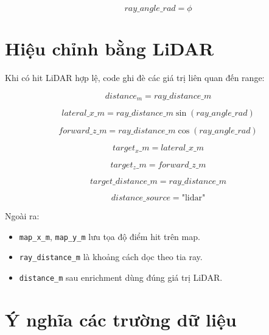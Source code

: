 \documentclass[12pt,a4paper]{article}
\begin{document}
\begin{equation}
ray\_angle\_rad = \phi
\end{equation}

\section{Hiệu chỉnh bằng LiDAR}

Khi có hit LiDAR hợp lệ, code ghi đè các giá trị liên quan đến range:

\begin{equation}
distance_m = ray\_distance\_m
\end{equation}

\begin{equation}
lateral\_x\_m = ray\_distance\_m \sin(ray\_angle\_rad)
\end{equation}

\begin{equation}
forward\_z\_m = ray\_distance\_m \cos(ray\_angle\_rad)
\end{equation}

\begin{equation}
target_x\_m = lateral\_x\_m
\end{equation}

\begin{equation}
target_z\_m = forward\_z\_m
\end{equation}

\begin{equation}
target\_distance\_m = ray\_distance\_m
\end{equation}

\begin{equation}
distance\_source = \text{"lidar"}
\end{equation}

Ngoài ra:

\begin{itemize}
    \item \texttt{map\_x\_m}, \texttt{map\_y\_m} lưu tọa độ điểm hit trên map.
    \item \texttt{ray\_distance\_m} là khoảng cách dọc theo tia ray.
    \item \texttt{distance\_m} sau enrichment dùng đúng giá trị LiDAR.
\end{itemize}

\section{Ý nghĩa các trường dữ liệu}
\end{document}
